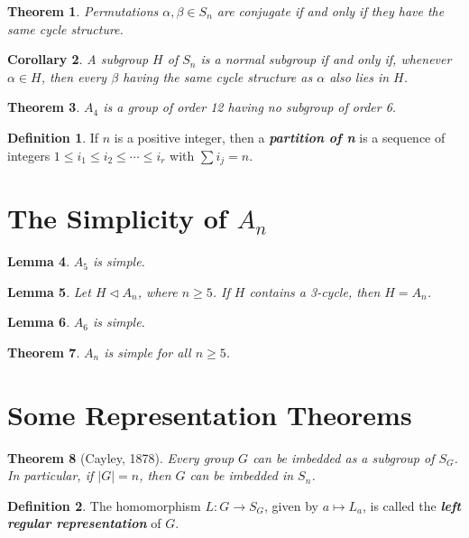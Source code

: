 \documentclass[12pt]{report}
\newtheorem{theorem}{Theorem}[chapter]
\newtheorem{corollary}[theorem]{Corollary}
\newtheorem{lemma}[theorem]{Lemma}
\theoremstyle{definition}
\newtheorem*{definition}{Definition}
\newcommand{\term}[1]{\textbf{\textit{#1}}}
\begin{document}
\begin{theorem}
	Permutations $\alpha,\beta\in S_n$ are conjugate if and only if they have the same cycle structure.
\end{theorem}

\begin{corollary}
	A subgroup $H$ of $S_n$ is a normal subgroup if and only if, whenever $\alpha\in H$, then every $\beta$ having the same
	cycle structure as $\alpha$ also lies in $H$.
\end{corollary}

\begin{theorem}
	$A_4$ is a group of order 12 having no subgroup of order 6.
\end{theorem}

\begin{definition}
	If $n$ is a positive integer, then a \term{partition of n} is a sequence of integers $1\leq i_1\leq i_2\leq\cdots\leq i_r$ with $\sum i_j = n$.
\end{definition}

\section{The Simplicity of $A_n$}

\begin{lemma}
	$A_5$ is simple.
\end{lemma}

\begin{lemma}
	Let $H\vartriangleleft A_n$, where $n\geq 5$. If $H$ contains a 3-cycle, then $H = A_n$.
\end{lemma}

\begin{lemma}
	$A_6$ is simple.
\end{lemma}

\begin{theorem}
	$A_n$ is simple for all $n\geq 5$.
\end{theorem}

\section{Some Representation Theorems}
\begin{theorem}[Cayley, 1878]
	Every group $G$ can be imbedded as a subgroup of $S_G$. In particular, if $|G|=n$, then $G$ can be imbedded in $S_n$.
\end{theorem}

\begin{definition}
	The homomorphism $L:G\to S_G$, given by $a\mapsto L_a$, is called the \term{left regular representation} of $G$.
\end{definition}
\end{document}

